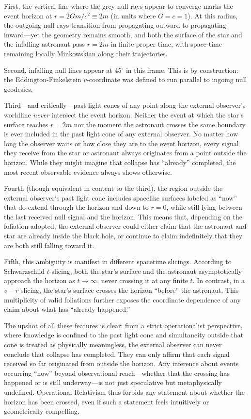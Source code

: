 \documentclass[12pt]{book}
\begin{document}
First, the vertical line where the grey null rays appear to converge marks the event horizon at $r = 2Gm/c^2 \equiv 2m$ (in units where $G = c = 1$). At this radius, the outgoing null rays transition from propagating outward to propagating inward---yet the geometry remains smooth, and both the surface of the star and the infalling astronaut pass $r = 2m$ in finite proper time, with space-time remaining locally Minkowskian along their trajectories.

Second, infalling null lines appear at 45$^\circ$ in this frame. This is by construction: the Eddington-Finkelstein $v$-coordinate was defined to run parallel to ingoing null geodesics.

Third---and critically---past light cones of any point along the external observer's worldline \textit{never} intersect the event horizon. Neither the event at which the star's surface reaches $r = 2m$ nor the moment the astronaut crosses the same boundary is ever included in the past light cone of any external observer. No matter how long the observer waits or how close they are to the event horizon, every signal they receive from the star or astronaut always originates from a point outside the horizon. While they might imagine that collapse has ``already'' completed, the most recent observable evidence always shows otherwise.

Fourth (though equivalent in content to the third), the region outside the external observer's past light cone includes spacelike surfaces labeled as ``now'' that do extend through the horizon and down to $r = 0$, while still lying between the last received null signal and the horizon. This means that, depending on the foliation adopted, the external observer could either claim that the astronaut and star are already inside the black hole, or continue to claim indefinitely that they are both still falling toward it.

Fifth, this ambiguity is manifest in different spacetime slicings. According to Schwarzschild $t$-slicing, both the star's surface and the astronaut asymptotically approach the horizon as $t \to \infty$, never crossing it at any finite $t$. In contrast, in a $v - r$ slicing, the star's surface crosses the horizon ``before'' the astronaut. This multiplicity of valid foliations further exposes the coordinate dependence of any claim about what has ``already happened.''

The upshot of all these features is clear: from a strict operationalist perspective, where knowledge is confined to the past light cone and simultaneity outside that cone is treated as physically meaningless, the external observer can never conclude that collapse has completed. They can only affirm that each signal received so far originated from outside the horizon. Any inference about events occurring ``now'' beyond observational reach---whether that the crossing has happened or is still underway---is not just speculative but metaphysically undefined. Operational Relativism thus forbids any statement about whether the horizon has been crossed, even if such a statement feels intuitively or geometrically compelling.
\end{document}
